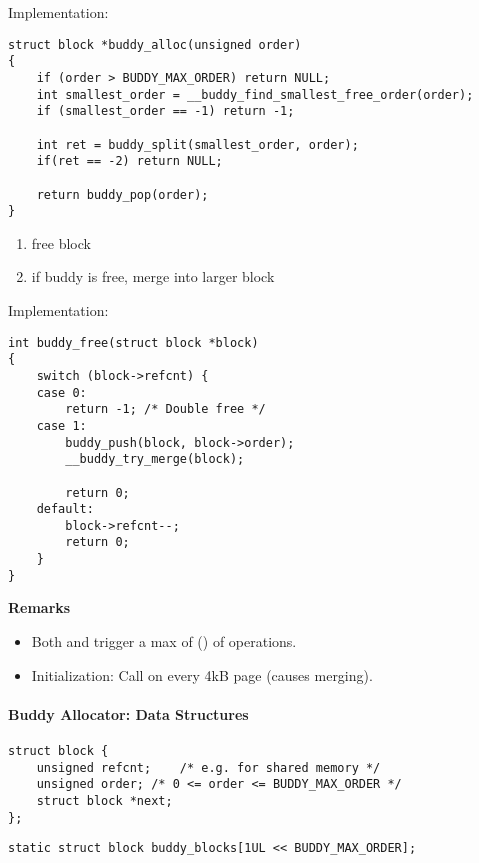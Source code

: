 Implementation:
\begin{lstlisting}[style=bright_C++]
struct block *buddy_alloc(unsigned order)
{
    if (order > BUDDY_MAX_ORDER) return NULL;
    int smallest_order = __buddy_find_smallest_free_order(order);
    if (smallest_order == -1) return -1;

    int ret = buddy_split(smallest_order, order);
    if(ret == -2) return NULL;

    return buddy_pop(order);
}
\end{lstlisting}

\newpar{}
\begin{enumerate}
    \item free block
    \item if buddy is free, merge into larger block
\end{enumerate}

Implementation:
\begin{lstlisting}[style=bright_C++]
int buddy_free(struct block *block)
{
    switch (block->refcnt) {
    case 0:
        return -1; /* Double free */
    case 1:
        buddy_push(block, block->order);
        __buddy_try_merge(block);

        return 0;
    default:
        block->refcnt--;
        return 0;
    }
}
\end{lstlisting}

\textbf{Remarks}
\begin{itemize}
    \item Both  and  trigger a max of () of operations. %
    \item Initialization: Call  on every 4kB page (causes merging).
\end{itemize}

\paragraph{Buddy Allocator: Data Structures}
\begin{lstlisting}[style=bright_C++]
struct block {
    unsigned refcnt;    /* e.g. for shared memory */
    unsigned order; /* 0 <= order <= BUDDY_MAX_ORDER */
    struct block *next;
};
\end{lstlisting}
\newpar{}
\begin{lstlisting}[style=bright_C++]
static struct block buddy_blocks[1UL << BUDDY_MAX_ORDER];
\end{lstlisting}

